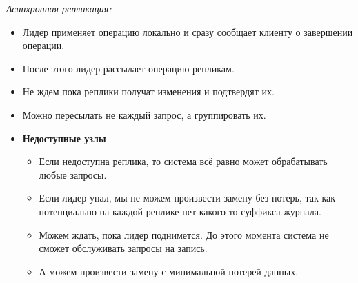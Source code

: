 \begin{definition}
    \textit{Асинхронная репликация:}
    \begin{itemize}
        \item Лидер применяет операцию локально и сразу сообщает клиенту о завершении операции.
        \item После этого лидер рассылает операцию репликам.
        \item Не ждем пока реплики получат изменения и подтвердят их.
        \item Можно пересылать не каждый запрос, а группировать их.

        \item \textbf{Недоступные узлы}
        \begin{itemize}
            \item Если недоступна реплика, то система всё равно может обрабатывать любые запросы.
            \item Если лидер упал, мы не можем произвести замену без потерь, так как потенциально на каждой реплике нет какого-то суффикса журнала.
            \item Можем ждать, пока лидер поднимется. До этого момента система не сможет обслуживать запросы на запись.
            \item А можем произвести замену с минимальной потерей данных.
        \end{itemize}
    \end{itemize}
\end{definition}
